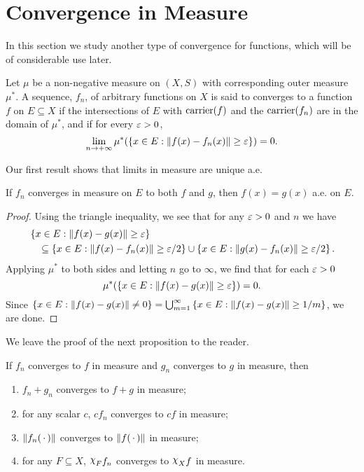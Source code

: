 \section{Convergence in Measure}

In this section we study another type of convergence for functions, which will be of considerable use later.
\begin{definition}
Let $\mu$ be a non-negative measure on $(X,S)$ with corresponding outer measure $\mu^*$. A sequence, $f_n$, of arbitrary functions on $X$ is said to converges to a function $f$  on $E\subseteq X$ if the intersections of $E$ with $\operatorname{carrier}(f)$ and the $\operatorname{carrier}(f_n)$ are in the domain of $\mu^*$, and if for every $\varepsilon>0$, \[\lim_{n\to+\infty}\mu^*(\left\{x\in E:\norm{f(x)-f_n(x)}\geq\varepsilon\right\})=0.\]
\end{definition}

Our first result shows that limits in measure are unique a.e.

\begin{proposition}\label{prop:uniqueness of in measure}
If $f_n$ converges in measure on $E$ to both $f$ and $g$, then $f(x)=g(x)$ a.e. on $E$.
\end{proposition}

\begin{proof}
Using the triangle inequality, we see that for any $\varepsilon>0$ and $n$ we have
\begin{align*}
&\left\{x\in E:\norm{f(x)-g(x)}\geq\varepsilon\right\}\\
&\quad\subseteq\left\{x\in E:\norm{f(x)-f_n(x)}\geq\varepsilon/2\right\}\cup\left\{x\in E:\norm{g(x)-f_n(x)}\geq\varepsilon/2\right\}.
\end{align*}
Applying $\mu^*$ to both sides and letting $n$ go to $\infty$, we find that for each $\varepsilon>0$ \[\mu^*(\left\{x\in E:\norm{f(x)-g(x)}\geq\varepsilon\right\})=0.\] Since $\left\{x\in E:\norm{f(x)-g(x)}\neq0\right\}=\bigcup_{m=1}^\infty\left\{x\in E:\norm{f(x)-g(x)}\geq1/m\right\}$, we are done.
\end{proof}

We leave the proof of the next proposition to the reader.

\begin{proposition}
If $f_n$ converges to $f$ in measure and $g_n$ converges to $g$ in measure, then
\begin{enumerate}[label=\arabic*)]
    \item $f_n+g_n$ converges to $f+g$ in measure;
    \item for any scalar $c$, $cf_n$ converges to $cf$ in measure;
    \item $\norm{f_n(\,\cdot\,)}$ converges to $\norm{f(\,\cdot\,)}$ in measure;
    \item for any $F\subseteq X$, $\idf{F}f_n$ converges to $\idf{X}f$ in measure.
\end{enumerate}
\end{proposition}

